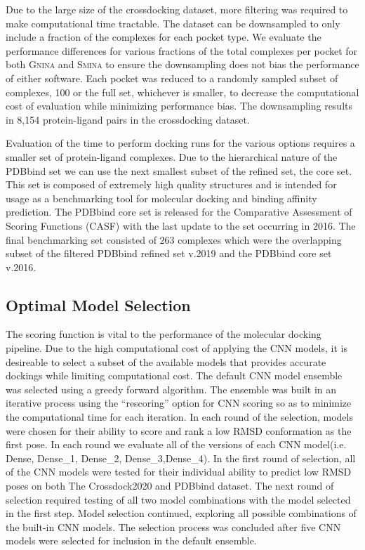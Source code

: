 \documentclass[journal=jcisd8,manuscript=article]{achemso}
\begin{document}
Due to the large size of the crossdocking dataset, more filtering was required to make computational time tractable. The dataset can be downsampled to only include a fraction of the complexes for each pocket type. We evaluate the performance differences for various fractions of the total complexes per pocket for both \textsc{Gnina} and \textsc{Smina} to ensure the downsampling does not bias the performance of either software. Each pocket was reduced to a randomly sampled subset of complexes, 100 or the full set, whichever is smaller, to decrease the computational cost of evaluation while minimizing performance bias. The downsampling results in 8,154 protein-ligand pairs in the crossdocking dataset. 

Evaluation of the time to perform docking runs for the various options requires a smaller set of protein-ligand complexes. Due to the hierarchical nature of the PDBbind set we can use the next smallest subset of the refined set, the core set. This set is composed of extremely high quality structures and is intended for usage as a benchmarking tool for molecular docking and binding affinity prediction. The PDBbind core set is released for the Comparative Assessment of Scoring Functions (CASF) with the last update to the set occurring in 2016\cite{su2018comparative}. The final benchmarking set consisted of $263$ complexes which were the overlapping subset of the filtered PDBbind refined set v.2019 and the PDBbind core set v.2016.

\subsection{Optimal Model Selection}
The scoring function is vital to the performance of the molecular docking pipeline. Due to the high computational cost of applying the CNN models, it is desireable to select a subset of the available models that provides accurate dockings while limiting computational cost. The default CNN model ensemble was selected using a greedy forward algorithm. The ensemble was built in an iterative process using the ``rescoring'' option for CNN scoring so as to minimize the computational time for each iteration. In each round of the selection, models were chosen for their ability to score and rank a low RMSD conformation as the first pose. In each round we evaluate all of the versions of each CNN model(i.e. Dense, Dense\_1, Dense\_2, Dense\_3,Dense\_4). In the first round of selection, all of the CNN models were tested for their individual ability to predict low RMSD poses on both The Crossdock2020 and PDBbind dataset. The next round of selection required testing of all two model combinations with the model selected in the first step. Model selection continued, exploring all possible combinations of the built-in CNN models. The selection process was concluded after five CNN models were selected for inclusion in the default ensemble.
\end{document}
